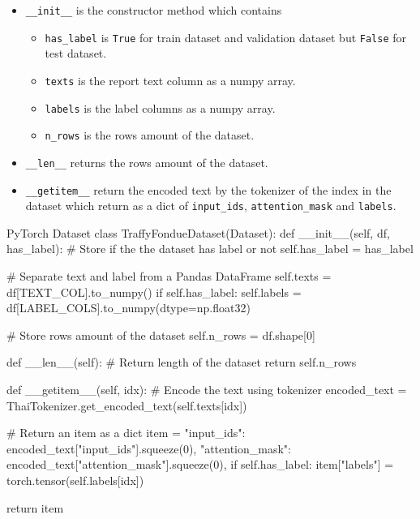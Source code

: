 \documentclass[12pt, a4paper]{article}
\begin{document}
                \begin{itemize}
                    \item \texttt{\_\_init\_\_} is the constructor method which contains
                    \begin{itemize}
                        \item \texttt{has\_label} is \texttt{True} for train dataset and validation dataset
                        but \texttt{False} for test dataset.
                        \item \texttt{texts} is the report text column as a numpy array.
                        \item \texttt{labels} is the label columns as a numpy array.
                        \item \texttt{n\_rows} is the rows amount of the dataset.
                    \end{itemize}
                    \item \texttt{\_\_len\_\_} returns the rows amount of the dataset.
                    \item \texttt{\_\_getitem\_\_} return the encoded text by the tokenizer of the index in the dataset
                    which return as a dict of \texttt{input\_ids}, \texttt{attention\_mask} and \texttt{labels}.
                \end{itemize}

                \begin{codeblock}{PyTorch Dataset}
                    class TraffyFondueDataset(Dataset):
                        def __init__(self, df, has_label):
                            # Store if the the dataset has label or not
                            self.has_label = has_label

                            # Separate text and label from a Pandas DataFrame
                            self.texts = df[TEXT_COL].to_numpy()
                            if self.has_label:
                                self.labels = df[LABEL_COLS].to_numpy(dtype=np.float32)

                            # Store rows amount of the dataset
                            self.n_rows = df.shape[0]

                        def __len__(self):
                            # Return length of the dataset
                            return self.n_rows

                        def __getitem__(self, idx):
                            # Encode the text using tokenizer
                            encoded_text = ThaiTokenizer.get_encoded_text(self.texts[idx])

                            # Return an item as a dict
                            item = {
                                "input_ids": encoded_text["input_ids"].squeeze(0),
                                "attention_mask": encoded_text["attention_mask"].squeeze(0),
                            }
                            if self.has_label:
                                item["labels"] = torch.tensor(self.labels[idx])

                            return item
                \end{codeblock}
\end{document}
